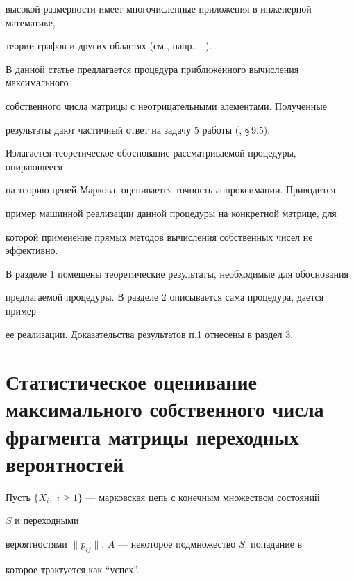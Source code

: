 высокой размерности имеет многочисленные приложения в инженерной математике, 


теории графов и других областях (см., напр., \cite{Pot}--\cite{Cve1}). 


 


В данной статье предлагается процедура приближенного вычисления максимального 


собственного числа матрицы с неотрицательными элементами. Полученные 


результаты дают частичный ответ на задачу 5 работы (\cite{Cve2}, \S\,9.5). 


 


Излагается теоретическое обоснование рассматриваемой процедуры, опирающееся 


на теорию цепей Маркова, оценивается точность аппроксимации. Приводится 


пример машинной реализации данной процедуры на конкретной матрице, для 


которой применение прямых методов вычисления собственных чисел не эффективно. 


 


В разделе 1 помещены теоретические результаты, необходимые для обоснования 


предлагаемой процедуры. В разделе 2 описывается сама процедура, дается пример 


ее реализации. Доказательства результатов п.1 отнесены в раздел 3. 


 


\section{Статистическое оценивание максимального собственного числа \protect\\


фрагмента матрицы переходных вероятностей} 


 


Пусть $\{X_i,\;i\ge 1\}$ --- марковская цепь с конечным множеством состояний 


$S$ и переходными 


вероятностями $\|p_{ij}\|$, $A$ --- некоторое подмножество $S$, попадание в 


которое трактуется как ``успех''. 


